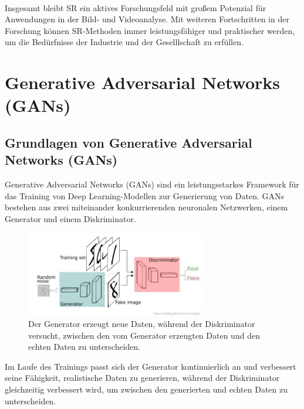 
        ~
        
        Insgesamt bleibt SR ein aktives Forschungsfeld mit großem Potenzial für Anwendungen in der Bild- und Videoanalyse.      
        Mit weiteren Fortschritten in der Forschung können SR-Methoden immer leistungsfähiger und praktischer werden, um die Bedürfnisse der Industrie und der Geselllschaft zu erfüllen.

\section{Generative Adversarial Networks (GANs)}

    \subsection{Grundlagen von Generative Adversarial Networks (GANs)}
        
        Generative Adversarial Networks (GANs) sind ein leistungsstarkes Framework für das Training von Deep Learning-Modellen zur Generierung von Daten.      
        GANs bestehen aus zwei miteinander konkurrierenden neuronalen Netzwerken, einem Generator und einem Diskriminator.

        \begin{figure}[h]
            \centering
            \includegraphics[width=0.7\textwidth]{img/GAN_architecture.jpg}
            \caption{Der Generator erzeugt neue Daten, während der Diskriminator versucht, zwischen den vom Generator erzeugten Daten und den echten Daten zu unterscheiden.}
            \label{fig:GAN_aufbau}
        \end{figure}
        
        Im Laufe des Trainings passt sich der Generator kontinuierlich an und verbessert seine Fähigkeit, realistische Daten zu generieren, während der Diskriminator gleichzeitig verbessert wird, um zwischen den generierten und echten Daten zu unterscheiden.
    

